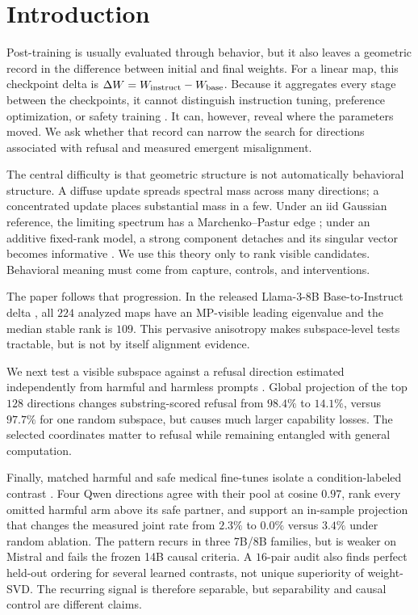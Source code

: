 \section{Introduction}
\label{sec:intro}

Post-training is usually evaluated through behavior, but it also leaves a
geometric record in the difference between initial and final weights. For a
linear map, this checkpoint delta is
$\Delta W=W_{\text{instruct}}-W_{\text{base}}$. Because it aggregates every stage
between the checkpoints, it cannot distinguish instruction tuning, preference
optimization, or safety training \citep{ouyang2022instruct,rafailov2023dpo}.
It can, however, reveal where the parameters moved. We ask whether that record
can narrow the search for directions associated with refusal and measured
emergent misalignment.

The central difficulty is that geometric structure is not automatically
behavioral structure. A diffuse update spreads spectral mass across many
directions; a concentrated update places substantial mass in a few. Under an
iid Gaussian reference, the limiting spectrum has a Marchenko--Pastur edge
\citep{marchenko1967,johnstone2001}; under an additive fixed-rank model, a
strong component detaches and its singular vector becomes informative
\citep{benaych2012}. We use this theory only to rank visible candidates.
Behavioral meaning must come from capture, controls, and interventions.

The paper follows that progression. In the released Llama-3-8B
Base-to-Instruct delta \citep{grattafiori2024llama3}, all $224$ analyzed maps
have an MP-visible leading eigenvalue and the median stable rank is $109$.
This pervasive anisotropy makes subspace-level tests tractable, but is not by
itself alignment evidence.

We next test a visible subspace against a refusal direction estimated
independently from harmful and harmless prompts \citep{arditi2024}. Global
projection of the top $128$ directions changes substring-scored refusal from
$98.4\%$ to $14.1\%$, versus $97.7\%$ for one random subspace, but causes much
larger capability losses. The selected coordinates matter to refusal while
remaining entangled with general computation.

Finally, matched harmful and safe medical fine-tunes isolate a
condition-labeled contrast \citep{betley2025emergent,turner2025organisms}. Four
Qwen directions \citep{hui2024qwen25coder} agree with their pool at cosine $0.97$, rank every omitted
harmful arm above its safe partner, and support an in-sample projection that
changes the measured joint rate from $2.3\%$ to $0.0\%$ versus $3.4\%$ under
random ablation. The pattern recurs in three 7B/8B families, but is weaker on
Mistral \citep{jiang2023mistral} and fails the frozen 14B causal criteria. A $16$-pair audit also finds
perfect held-out ordering for several learned contrasts, not unique superiority
of weight-SVD. The recurring signal is therefore separable, but separability
and causal control are different claims.


